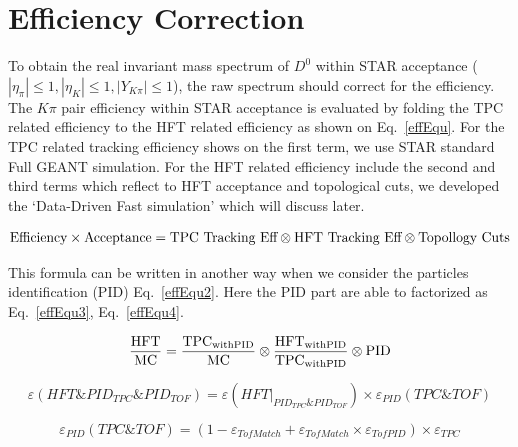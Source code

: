 \clearpage

\section{Efficiency Correction}

To obtain the real invariant mass spectrum of $D^0$ within STAR acceptance ($|\eta_{\pi}| \leq 1, |\eta_{K}| \leq 1, |Y_{K\pi}| \leq 1$), the raw spectrum should correct for the efficiency. The $K\pi$ pair efficiency within STAR acceptance is evaluated by folding the TPC related efficiency to the HFT related efficiency as shown on Eq.~\ref{effEqu}. For the TPC related tracking efficiency shows on the first term, we use STAR standard Full GEANT simulation. For the HFT related efficiency include the second and third terms which reflect to HFT acceptance and topological cuts, we developed the `Data-Driven Fast simulation' which will discuss later.

\begin{equation}
  \textup{Efficiency} \times \textup{Acceptance}  = \textup{TPC Tracking Eff} \otimes \textup{HFT Tracking Eff} \otimes \textup{Topollogy Cuts}
\label{effEqu}
\end{equation}

This formula can be written in another way when we consider the particles identification (PID) Eq.~\ref{effEqu2}. Here the PID part are able to factorized as Eq.~\ref{effEqu3}, Eq.~\ref{effEqu4}.

\begin{equation}
  \frac{\textup{HFT}}{\textup{MC}} =  \frac{\textup{TPC}_\textup{{withPID}}}{\textup{MC}} \otimes \frac{\textup{HFT}_\textup{{withPID}}}{\textup{TPC}_\textup{{withPID}}} \otimes \textup{PID}
\label{effEqu2}
\end{equation}

\begin{equation}
  \varepsilon(HFT \& PID_{TPC} \& PID_{TOF}) = \varepsilon(HFT | _{PID_{TPC} \& PID_{TOF}}) \times \varepsilon_{PID}(TPC\&TOF)
\label{effEqu3}
\end{equation}

\begin{equation}
  \varepsilon_{PID}(TPC\&TOF) = (1 - \varepsilon_{TofMatch} + \varepsilon_{TofMatch} \times \varepsilon_{TofPID}) \times \varepsilon_{TPC}
\label{effEqu4}
\end{equation}

